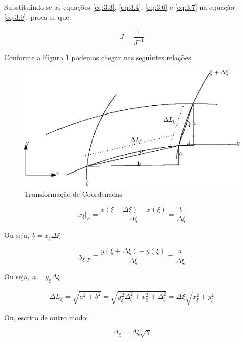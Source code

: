 Substituindo-se as equações \ref{eq:3.3}, \ref{eq:3.4}, \ref{eq:3.6} e \ref{eq:3.7} na equação \ref{eq:3.9}, prova-se que:

\begin{equation}
    \label{eq:3.10}
    J = \frac{1}{J^{-1}}
\end{equation}

Conforme a Figura \ref{Figura9} podemos chegar nas seguintes relações:

\begin{figure}[]
    \centering
    \includegraphics{fig/transformacao.eps}
    \caption{Transformação de Coordenadas}
    \label{Figura9}
\end{figure}

\begin{equation*}
    x_\xi \vert_P = \frac{x(\xi+\Delta \xi)-x(\xi)}{\Delta \xi} = \frac{b}{\Delta \xi}
\end{equation*}

Ou seja, $b=x_\xi \Delta \xi$

\begin{equation*}
    y_\xi \vert_P = \frac{y(\xi+\Delta \xi)-y(\xi)}{\Delta \xi} = \frac{a}{\Delta \xi}    
\end{equation*}

Ou seja, $a=y_\xi \Delta \xi$

\begin{equation*}
    \Delta L_\xi = \sqrt{a^2+b^2} = \sqrt{y_\xi^2 \Delta_\xi^2 + x_\xi^2+\Delta_\xi^2} = \Delta \xi \sqrt{x_\xi^2 + y_\xi^2}
\end{equation*}

Ou, escrito de outro modo:

\begin{equation}
    \label{eq:3.11}
    \Delta_\xi = \Delta \xi \sqrt{\gamma}
\end{equation}

